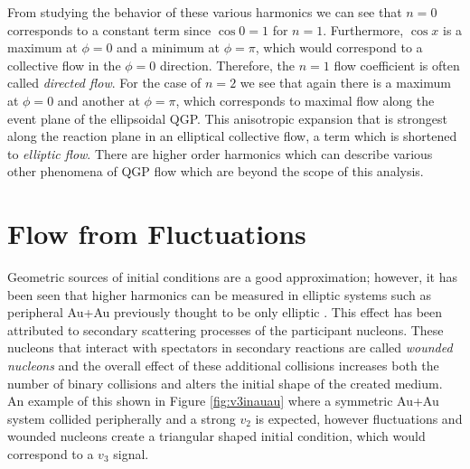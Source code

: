 From studying the behavior of these various harmonics we can see that $n=0$ corresponds to a constant term since $\cos{0} = 1$ for $n=1$. Furthermore, $\cos{x}$ is a maximum at $\phi=0$ and a minimum at $\phi = \pi$, which would correspond to a collective flow in the $\phi=0$ direction. Therefore, the $n=1$ flow coefficient is often called \textit{directed flow}. For the case of $n=2$ we see that again there is a maximum at $\phi=0$ and another at $\phi=\pi$, which corresponds to maximal flow along the event plane of the ellipsoidal QGP. This anisotropic expansion that is strongest along the reaction plane in an elliptical collective flow, a term which is shortened to \textit{elliptic flow}. There are higher order harmonics which can describe various other phenomena of QGP flow which are beyond the scope of this analysis.

\section{Flow from Fluctuations}
Geometric sources of initial conditions are a good approximation; however, it has been seen that higher harmonics can be measured in elliptic systems such as peripheral Au+Au previously thought to be only elliptic \citep{Alver:2010gr}. This effect has been attributed to secondary scattering processes of the participant nucleons. These nucleons that interact with spectators in secondary reactions are called \textit{wounded nucleons} and the overall effect of these additional collisions increases both the number of binary collisions and alters the initial shape of the created medium. An example of this shown in Figure \ref{fig:v3inauau} where a symmetric Au+Au system collided peripherally and a strong $v_2$ is expected, however fluctuations and wounded nucleons create a triangular shaped initial condition, which would correspond to a $v_3$ signal.

